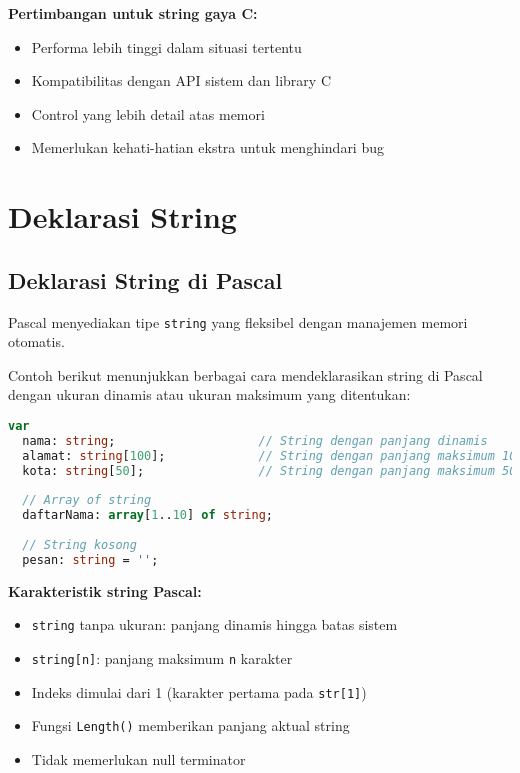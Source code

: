 \documentclass[../main.tex]{subfiles}
\begin{document}
\textbf{Pertimbangan untuk string gaya C:}
\begin{itemize}
  \item Performa lebih tinggi dalam situasi tertentu
  \item Kompatibilitas dengan API sistem dan library C
  \item Control yang lebih detail atas memori
  \item Memerlukan kehati-hatian ekstra untuk menghindari bug
\end{itemize}

\section{Deklarasi String}

\subsection{Deklarasi String di Pascal}

Pascal menyediakan tipe \texttt{string} yang fleksibel dengan manajemen memori otomatis.

Contoh berikut menunjukkan berbagai cara mendeklarasikan string di Pascal dengan ukuran dinamis atau ukuran maksimum yang ditentukan:

\begin{lstlisting}[language=Pascal, caption={Deklarasi string di Pascal}]
var
  nama: string;                    // String dengan panjang dinamis
  alamat: string[100];             // String dengan panjang maksimum 100
  kota: string[50];                // String dengan panjang maksimum 50
  
  // Array of string
  daftarNama: array[1..10] of string;
  
  // String kosong
  pesan: string = '';
\end{lstlisting}

\textbf{Karakteristik string Pascal:}
\begin{itemize}
  \item \texttt{string} tanpa ukuran: panjang dinamis hingga batas sistem
  \item \texttt{string[n]}: panjang maksimum \texttt{n} karakter
  \item Indeks dimulai dari 1 (karakter pertama pada \texttt{str[1]})
  \item Fungsi \texttt{Length()} memberikan panjang aktual string
  \item Tidak memerlukan null terminator
\end{itemize}
\end{document}
